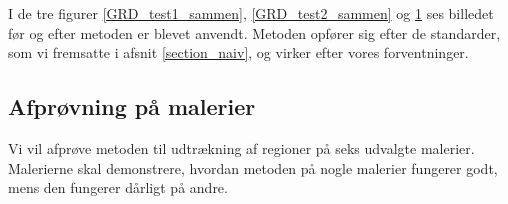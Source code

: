 \begin{figure}[!h]
    \centering
    	\hspace{1em}
		\hspace{1em}
        \caption[]{}
     \label{GRD_test3_sammen}
\end{figure}

I de tre figurer \ref{GRD_test1_sammen}, \ref{GRD_test2_sammen} og
\ref{GRD_test3_sammen} ses billedet før og efter metoden er blevet anvendt.
Metoden opfører sig efter de standarder, som vi fremsatte i afsnit \ref{section_naiv}, og
virker efter vores forventninger.
\clearpage

\subsection{Afprøvning på malerier}
Vi vil afprøve metoden til udtrækning af regioner på seks udvalgte
malerier. Malerierne skal demonstrere, hvordan metoden på nogle malerier
fungerer godt, mens den fungerer dårligt på andre.

